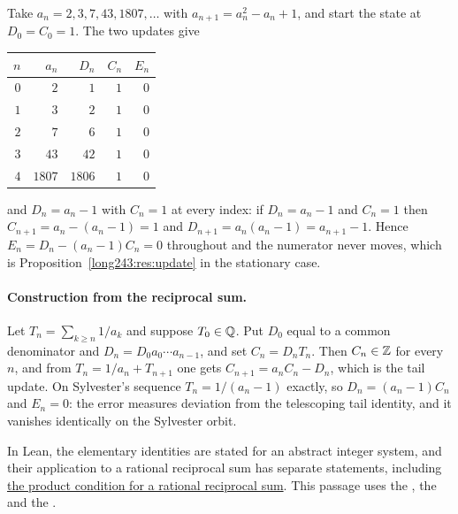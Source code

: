 \documentclass[11pt]{article}
\begin{document}
\begin{example}\label{long243:ex:sylvester}
Take $a_n=2,3,7,43,1807,\ldots$ with $a_{n+1}=a_n^{2}-a_n+1$, and start the
state at $D_0=C_0=1$.  The two updates give

\begin{center}
\begin{tabular}{@{}rrrrr@{}}
\toprule
$n$ & $a_n$ & $D_n$ & $C_n$ & $E_n$\\
\midrule
$0$ & $2$ & $1$ & $1$ & $0$\\
$1$ & $3$ & $2$ & $1$ & $0$\\
$2$ & $7$ & $6$ & $1$ & $0$\\
$3$ & $43$ & $42$ & $1$ & $0$\\
$4$ & $1807$ & $1806$ & $1$ & $0$\\
\bottomrule
\end{tabular}
\end{center}

\noindent and $D_n=a_n-1$ with $C_n=1$ at every index: if $D_n=a_n-1$ and
$C_n=1$ then $C_{n+1}=a_n-(a_n-1)=1$ and $D_{n+1}=a_n(a_n-1)=a_{n+1}-1$.
Hence $E_n=D_n-(a_n-1)C_n=0$ throughout and the numerator never moves, which
is Proposition~\ref{long243:res:update} in the stationary case.
\end{example}

\paragraph{Construction from the reciprocal sum.}
Let $T_n=\sum_{k\ge n}1/a_k$ and suppose $T_0\in\mathbb{Q}$.  Put $D_0$ equal to a
common denominator and $D_n=D_0a_0\cdots a_{n-1}$, and set $C_n=D_nT_n$.  Then
$C_n\in\mathbb{Z}$ for every $n$, and from $T_n=1/a_n+T_{n+1}$ one gets
$C_{n+1}=a_nC_n-D_n$, which is the tail update.  On Sylvester's sequence
$T_n=1/(a_n-1)$ exactly, so $D_n=(a_n-1)C_n$ and $E_n=0$: the error
measures deviation from the telescoping tail identity, and it vanishes
identically on the Sylvester orbit.

In Lean, the elementary identities are stated for an abstract integer
system, and their application to a rational reciprocal sum has separate
statements, including
\href{https://github.com/wcook04/plectis-erdos/blob/3d6d938d696fed0fb71dd55115a18a73738ff223/lean/ErdosProblems/Erdos243/PaperCompleteR7/ProductDefect.lean\#L211}{the product condition for a rational reciprocal sum}.
This passage uses the
,
the 
and the .
\end{document}
